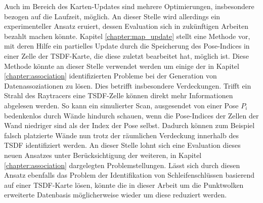 Auch im Bereich des Karten-Updates sind mehrere Optimierungen, insbesondere bezogen auf die Laufzeit, möglich. An dieser Stelle wird allerdings ein experimenteller Ansatz eruiert, dessen Evaluation sich in zukünftigen Arbeiten bezahlt machen könnte. Kapitel \ref{chapter:map_update} stellt eine Methode vor, mit deren Hilfe ein partielles Update durch die Speicherung des Pose-Indices in einer Zelle der TSDF-Karte, die diese zuletzt bearbeitet hat, möglich ist. Diese Methode könnte an dieser Stelle verwendet werden um einige der in Kapitel \ref{chapter:association} identifizierten Probleme bei der Generation von Datenassoziationen zu lösen. Dies betrifft insbesondere Verdeckungen. Trifft ein Strahl des Raytracers eine TSDF-Zelle können direkt mehr Informationen abgelesen werden. So kann ein simulierter Scan, ausgesendet von einer Pose $P_i$ bedenkenlos durch Wände hindurch schauen, wenn die Pose-Indices der Zellen der Wand niedriger sind als der Index der Pose selbst. Dadurch können zum Beispiel falsch platzierte Wände nun trotz der räumlichen Verdeckung innerhalb des TSDF identifiziert werden. An dieser Stelle lohnt sich eine Evaluation dieses neuen Ansatzes unter Berücksichtigung der weiteren, in Kapitel \ref{chapter:association} dargelegten Problemstellungen. Lässt sich durch diesen Ansatz ebenfalls das Problem der Identifikation von Schleifenschlüssen basierend auf einer TSDF-Karte lösen, könnte die in dieser Arbeit um die Punktwolken erweiterte Datenbasis möglicherweise wieder um diese reduziert werden. 


